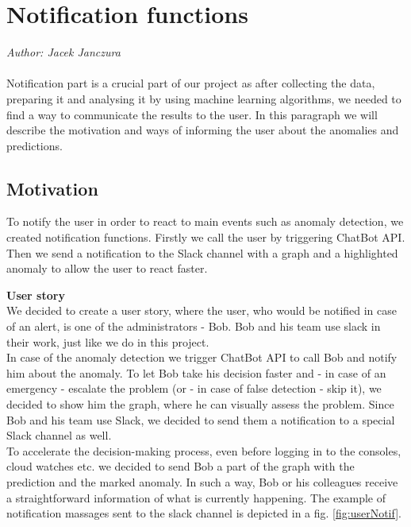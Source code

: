 \section{Notification functions}
\label{sec:notification_functions}
\textit{Author: Jacek Janczura} \\ \\
Notification part is a crucial part of our project as after collecting the data, preparing it and analysing it by using machine learning algorithms, we needed to find a way to communicate the results to the user. In this paragraph we will describe the motivation and ways of informing the user about the anomalies and predictions.

\subsection{Motivation}
To notify the user in order to react to main events such as anomaly detection, we created notification functions. Firstly we call the user by triggering ChatBot API. Then we send a notification to the Slack channel with a graph and a highlighted anomaly to allow the user to react faster.

\textbf{User story} \\
We decided to create a user story, where the user, who would be notified in case of an alert, is one of the administrators - Bob. Bob and his team use slack in their work, just like we do in this project. \\
In case of the anomaly detection we trigger ChatBot API to call Bob and notify him about the anomaly. To let Bob take his decision faster and - in case of an emergency - escalate the problem (or - in case of false detection - skip it), we decided to show him the graph, where he can visually assess the problem. Since Bob and his team use Slack, we decided to send them a notification to a special Slack channel as well. \\
To accelerate the decision-making process, even before logging in to the consoles, cloud watches etc. we decided to send Bob a part of the graph with the prediction and the marked anomaly. In such a way, Bob or his colleagues  receive a straightforward information of what is currently happening. The example of notification massages sent to the slack channel is depicted in a fig. \ref{fig:userNotif}.

